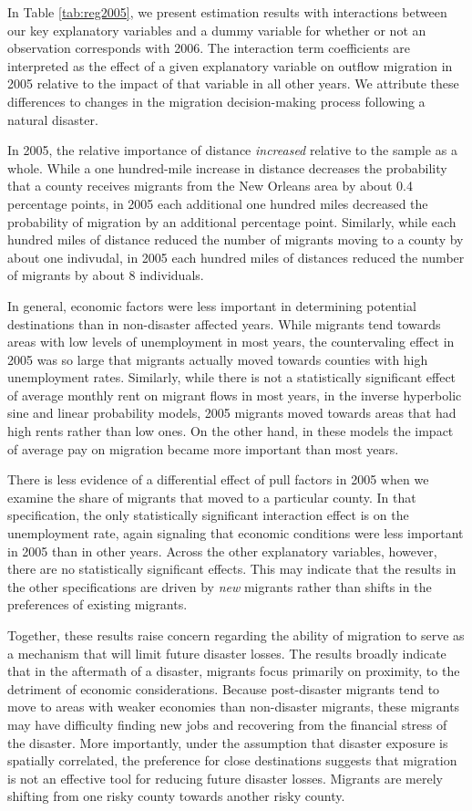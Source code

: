 \documentclass[]{article}
\begin{document}
In Table \ref{tab:reg2005}, we present estimation results with
interactions between our key explanatory variables and a dummy variable
for whether or not an observation corresponds with 2006. The interaction
term coefficients are interpreted as the effect of a given explanatory
variable on outflow migration in 2005 relative to the impact of that
variable in all other years. We attribute these differences to changes
in the migration decision-making process following a natural disaster.

In 2005, the relative importance of distance \emph{increased} relative
to the sample as a whole. While a one hundred-mile increase in distance
decreases the probability that a county receives migrants from the New
Orleans area by about 0.4 percentage points, in 2005 each additional one
hundred miles decreased the probability of migration by an additional
percentage point. Similarly, while each hundred miles of distance
reduced the number of migrants moving to a county by about one
indivudal, in 2005 each hundred miles of distances reduced the number of
migrants by about 8 individuals.

In general, economic factors were less important in determining
potential destinations than in non-disaster affected years. While
migrants tend towards areas with low levels of unemployment in most
years, the countervaling effect in 2005 was so large that migrants
actually moved towards counties with high unemployment rates. Similarly,
while there is not a statistically significant effect of average monthly
rent on migrant flows in most years, in the inverse hyperbolic sine and
linear probability models, 2005 migrants moved towards areas that had
high rents rather than low ones. On the other hand, in these models the
impact of average pay on migration became more important than most
years.

There is less evidence of a differential effect of pull factors in 2005
when we examine the share of migrants that moved to a particular county.
In that specification, the only statistically significant interaction
effect is on the unemployment rate, again signaling that economic
conditions were less important in 2005 than in other years. Across the
other explanatory variables, however, there are no statistically
significant effects. This may indicate that the results in the other
specifications are driven by \emph{new} migrants rather than shifts in
the preferences of existing migrants.

Together, these results raise concern regarding the ability of migration
to serve as a mechanism that will limit future disaster losses. The
results broadly indicate that in the aftermath of a disaster, migrants
focus primarily on proximity, to the detriment of economic
considerations. Because post-disaster migrants tend to move to areas
with weaker economies than non-disaster migrants, these migrants may
have difficulty finding new jobs and recovering from the financial
stress of the disaster. More importantly, under the assumption that
disaster exposure is spatially correlated, the preference for close
destinations suggests that migration is not an effective tool for
reducing future disaster losses. Migrants are merely shifting from one
risky county towards another risky county.
\end{document}
